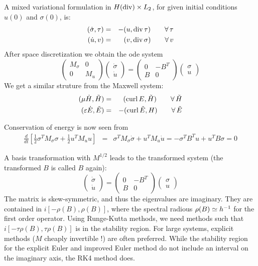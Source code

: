 A mixed variational formulation in $H(\operatorname{div}) \times L_2$, for
given initial conditions $u(0)$ and $\sigma(0)$, is:
\begin{eqnarray*}
(\dot \sigma, \tau) & = & - (u, \operatorname{div} \tau) \qquad \forall \, \tau \\
(\dot u, v) & = & (v, \operatorname{div} \sigma) \qquad \forall \, v
\end{eqnarray*}
After space discretization we obtain the ode system
$$
\left( \begin{array}{cc}
 M_\sigma  & 0 \\
0 & M_u 
\end{array} \right) 
\left( \begin{array}{c} \dot \sigma \\ \dot u \end{array} \right) = 
\left( \begin{array}{cc}
0 & -B^T \\
B & 0
\end{array} \right) 
\left( \begin{array}{c} \sigma \\ u \end{array} \right) 
$$
We get a similar struture from the Maxwell system:
\begin{eqnarray*}
(\mu \dot H, \tilde H) & = & (\operatorname{curl} E, \tilde H)  \qquad \forall \, \tilde H \\
(\varepsilon \dot E, \tilde E) & = & -(\operatorname{curl} \tilde E, H) \qquad \forall \, \tilde E
\end{eqnarray*}

Conservation of energy is now seen from
\begin{eqnarray*}
\frac{d}{dt} \left[  \tfrac{1}{2}  \sigma^T M_\sigma \sigma + \tfrac{1}{2} u^T M_u u \right] 
& = & \sigma^T M_\sigma \dot \sigma + u^T M_u \dot u = -\sigma^T B^T u + u^T B \sigma = 0
\end{eqnarray*}

A basis transformation with $M^{1/2}$ leads to the transformed system (the transformed $B$ is called $B$ again):
$$
\left( \begin{array}{c} \dot \sigma \\ \dot u \end{array} \right) = 
\left( \begin{array}{cc}
0 & -B^T \\
B & 0
\end{array} \right) 
\left( \begin{array}{c} \sigma \\ u \end{array} \right) 
$$
The matrix is skew-symmetric, and thus the eigenvalues are imaginary. They are contained in $i \left[ -\rho(B), \rho(B) \right]$, where the spectral radious $\rho(B) \simeq h^{-1}$ for the first order operator. Using Runge-Kutta methods, we need methods such that $i \left[ -\tau \rho(B), \tau \rho(B) \right]$ is in the stability region. For large systems, explicit methods ($M$ cheaply invertible !) are often preferred. While the stability region for the explicit Euler and improved Euler method do not include an interval on the imaginary axis, the RK4 method does.

